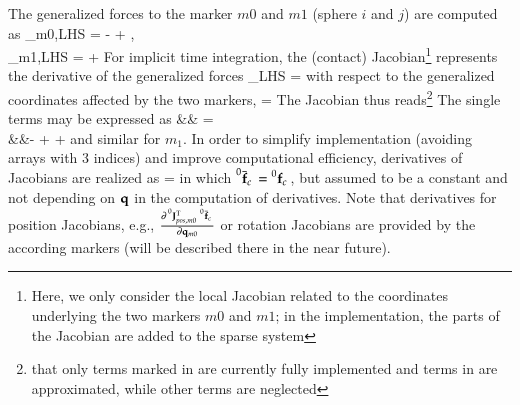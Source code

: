 The generalized forces to the marker $m0$ and $m1$ (sphere $i$ and $j$) are computed as
\bea
  \fv_{m0,LHS} = -  + 
                  , \nonumber \\
  \fv_{m1,LHS} =   + 
                   \eqDot
\eea
%
%
For implicit time integration, the (contact) Jacobian\footnote{Here, we only consider the local Jacobian related to the coordinates underlying the two markers $m0$ and $m1$; in the implementation, the parts of the Jacobian are added to the sparse system } represents the derivative of the generalized forces 
\be
  \fv_{LHS} = 
\ee
with respect to the generalized coordinates affected by the two markers,
\be
  \qv =  \eqDot
\ee
The Jacobian thus reads\footnote{ that only terms marked in  are currently fully implemented and terms in  are approximated, while other terms are neglected}
\be
\ee
The single terms may be expressed as
\bea
  && = \nonumber \\
  &&- 
   
  + 
  + 
  \eqComma
\eea
and similar for $m_1$.
In order to simplify implementation (avoiding arrays with 3 indices) and improve computational efficiency, 
derivatives of Jacobians are realized as
\be
    = 
  \eqComma
\ee
in which $\prescript{0}{}{\bar {\mathbf{f}}_c}\, = \prescript{0}{}{\mathbf{f}_c}\,$, but assumed to be a constant and not depending on $\mathbf{q}$ in the computation of derivatives.
Note that derivatives for position Jacobians, e.g., $\frac{\partial \prescript{0}{}{\mathbf{J}_{pos,m0}^\mathrm{T}}\, \prescript{0}{}{\bar {\mathbf{f}}_c}\,}{\partial \mathbf{q}_{m0}}$ or rotation
Jacobians are provided by the according markers (will be described there in the near future).

